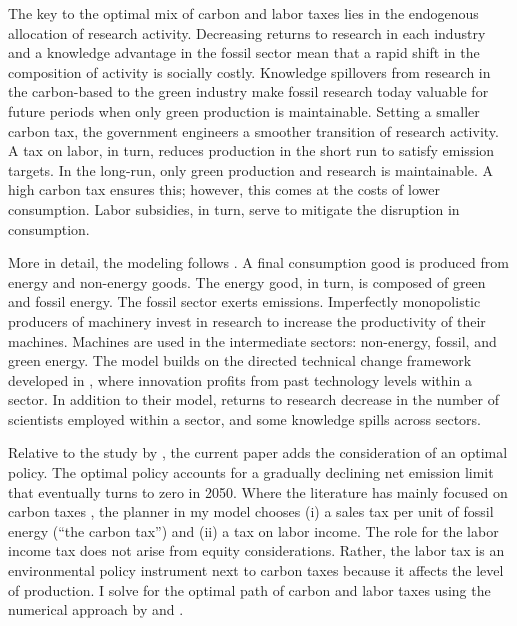 The key to the optimal mix of carbon and labor taxes lies in the endogenous allocation of research activity. Decreasing returns to  research in each industry and a knowledge advantage in the fossil sector mean that a rapid shift in the composition of activity is socially costly.  Knowledge spillovers from research in the carbon-based  to the green industry make fossil research today valuable for future periods when only green production is maintainable. Setting a smaller carbon tax, the government  engineers a smoother transition of research activity. A tax on labor, in turn, reduces production in the short run to satisfy emission targets. In the long-run, only green production and research is maintainable. A high carbon tax ensures this; however, this comes at the costs of lower consumption. Labor subsidies, in turn, serve to mitigate the disruption in consumption.

More in detail, the modeling follows \cite{Fried2018ClimateAnalysis}. A final consumption good is produced from energy and non-energy goods. The energy good, in turn, is composed of green and fossil energy. The fossil sector exerts emissions. Imperfectly monopolistic producers of machinery invest in research to increase the productivity of their machines. Machines are used in the intermediate sectors: non-energy, fossil, and green energy.  The model builds on the directed technical change framework developed in \cite{Acemoglu2012TheChange}, where innovation profits from past technology levels within a sector. In addition to their model, returns to research decrease in the number of scientists employed within a sector, and some knowledge spills across sectors.

Relative to the study by \cite{Fried2018ClimateAnalysis}, the current paper adds the consideration of an optimal policy. The optimal policy accounts for a gradually declining  net emission limit that eventually turns to zero in 2050. Where the literature  has mainly focused on carbon taxes \citep{Fried2018ClimateAnalysis, Barrage2019OptimalPolicy}, the planner in my model chooses (i) a sales tax per unit of fossil energy (“the carbon tax”) and (ii) a tax on labor income. The role for the labor income tax does not arise from equity considerations. Rather, the labor tax is an environmental policy instrument next to carbon taxes because it affects the level of production.  I solve for the optimal path of carbon and labor taxes using the numerical approach by  \cite{Jones1993OptimalGrowth} and \cite{Barrage2019OptimalPolicy}.

